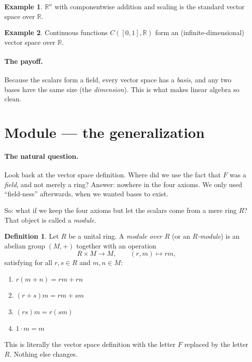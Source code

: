\documentclass[11pt]{article}
\theoremstyle{definition}
\newtheorem*{defn}{Definition}
\newtheorem*{ex}{Example}
\begin{document}
\begin{ex}
$\mathbb{R}^n$ with componentwise addition and scaling is the standard vector space
over $\mathbb{R}$.
\end{ex}

\begin{ex}
Continuous functions $C([0,1],\mathbb{R})$ form an (infinite-dimensional) vector
space over $\mathbb{R}$.
\end{ex}

\paragraph{The payoff.}
Because the scalars form a field, every vector space has a \emph{basis}, and any
two bases have the same size (the \emph{dimension}). This is what makes linear
algebra so clean.

\section{Module --- the generalization}

\paragraph{The natural question.}
Look back at the vector space definition. Where did we use the fact that $F$ was a
\emph{field}, and not merely a ring? Answer: nowhere in the four axioms.
We only used ``field-ness'' afterwards, when we wanted bases to exist.

So: what if we keep the four axioms but let the scalars come from a mere ring $R$?
That object is called a \emph{module}.

\begin{defn}
Let $R$ be a unital ring. A \emph{module over $R$} (or an \emph{$R$-module})
is an abelian group $(M,+)$ together with an operation
\[
R \times M \to M, \qquad (r, m) \mapsto rm,
\]
satisfying for all $r,s\in R$ and $m,n\in M$:
\begin{enumerate}[label=(M\arabic*), leftmargin=3em]
  \item $r(m+n) = rm + rn$
  \item $(r+s)m = rm + sm$
  \item $(rs)m = r(sm)$
  \item $1\cdot m = m$
\end{enumerate}
\end{defn}

\noindent This is literally the vector space definition with the letter $F$ replaced
by the letter $R$. Nothing else changes.
\end{document}

